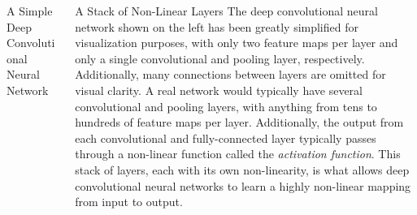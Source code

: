 \documentclass[final,hyperref={pdfpagelabels=false}]{beamer}
\begin{document}
\begin{frame}
\begin{columns}[T]
\begin{column}{.32\textwidth}
      \begin{block}{A Simple Deep Convolutional Neural Network}
        \begin{figure}
          \includegraphics[width=0.9\textwidth]{images/svg/convnet.png}
        \end{figure}
      \end{block}
    \end{column}

  	\begin{column}{.32\textwidth}
      \begin{block}{A Stack of Non-Linear Layers}
        The deep convolutional neural network shown on the left has been greatly simplified for visualization purposes, with only
        two feature maps per layer and only a single convolutional and pooling layer, respectively.  Additionally, many connections
        between layers are omitted for visual clarity.
        A real network would typically have several convolutional and pooling layers, with anything from tens to hundreds of feature
        maps per layer.  Additionally, the output from each convolutional and fully-connected layer typically passes through a 
        non-linear function called the \emph{activation function}.  This stack of layers, each with its own non-linearity, is what
        allows deep convolutional neural networks to learn a highly non-linear mapping from input to output.
      \end{block}


\end{column}
\end{columns}
\end{frame}
\end{document}
